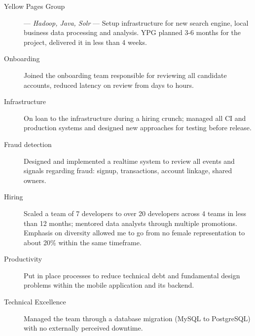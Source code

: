 \begin{description}
\vspace{1 mm}
\item[Yellow Pages Group] --- \textit{Hadoop, Java, Solr} --- Setup infrastructure for new search engine, local business data processing and analysis. YPG planned 3-6 months for the project, delivered it in less than 4 weeks.
\end{description}

\vspace{4 mm}

\begin{langen}
\begin{description}%
\item[Onboarding] Joined the onboarding team responsible for reviewing all candidate accounts, reduced latency on review from days to hours.
\item[Infrastructure] On loan to the infrastructure during a hiring crunch; managed all CI and production systems and designed new approaches for testing before release.
\item[Fraud detection] Designed and implemented a realtime system to review all events and signals regarding fraud: signup, transactions, account linkage, shared owners.
\end{description}
\end{langen}

\vspace{4 mm}

\begin{langen}
\begin{description}%
\item[Hiring] Scaled a team of 7 developers to over 20 developers across 4 teams in less than 12 months; mentored data analysts through multiple promotions. Emphasis on diversity allowed me to go from no female representation to about 20\% within the same timeframe.
\item[Productivity] Put in place processes to reduce technical debt and fundamental design problems within the mobile application and its backend.
\item[Technical Excellence] Managed the team through a database migration (MySQL to PostgreSQL) with no externally perceived downtime.
\end{description}
\end{langen}

